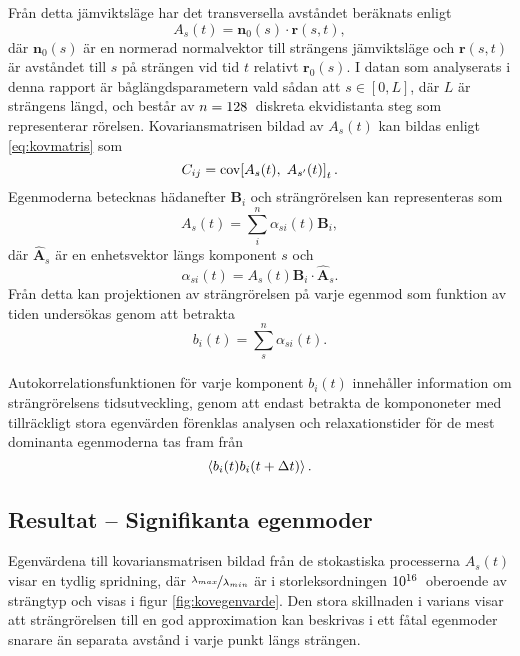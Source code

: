 Från detta jämviktsläge har det transversella avståndet beräknats enligt 
\begin{equation}
A_s(t) = \mathbf{n}_0(s)\cdot\mathbf{r}(s,t),
\end{equation}
där $\mathbf{n}_0(s)$ är en normerad normalvektor till strängens jämviktsläge och $\mathbf{r}(s,t)$ är avståndet till $s$ på strängen vid tid $t$ relativt $\mathbf{r}_0(s)$. I datan som analyserats i denna rapport är båglängdsparametern vald sådan att $s\in[0,L]$, där $L$ är strängens längd, och består av $n=\unit[128]{}$ diskreta ekvidistanta steg som representerar rörelsen. Kovariansmatrisen bildad av $A_s(t)$ kan bildas enligt \eqref{eq:kovmatris} som 
\begin{equation}
    C_{ij} = \text{cov}\!\left[A_s(t),\;A_{s'}(t)\right]_t.
\end{equation}
Egenmoderna betecknas hädanefter $\mathbf{B}_i$ och strängrörelsen kan representeras som
\begin{equation}
    A_s(t) = \sum_i^n \alpha_{si}(t)\mathbf{B}_i,
\end{equation}
där $\hat{\mathbf{A}}_s$ är en enhetsvektor längs komponent $s$ och 
\begin{equation}
    \alpha_{si}(t) = A_s(t)\mathbf{B}_i\cdot\hat{\mathbf{A}}_s.
\end{equation}
Från detta kan projektionen av strängrörelsen på varje egenmod som funktion av tiden undersökas genom att betrakta 
\begin{equation}
    b_i(t) = \sum_s^n \alpha_{si}(t).
\end{equation}

Autokorrelationsfunktionen för varje komponent $b_i(t)$ innehåller information om strängrörelsens tidsutveckling, genom att endast betrakta de kompononeter med tillräckligt stora egenvärden förenklas analysen och relaxationstider för de mest dominanta egenmoderna tas fram från 
\begin{equation}
    \ev{b_i(t)b_i(t+\Delta t)}.
\end{equation}

\subsection{Resultat -- Signifikanta egenmoder}

Egenvärdena till kovariansmatrisen bildad från de stokastiska processerna $A_s(t)$ visar en tydlig spridning, där $\nicefrac{\lambda_{max}}{\lambda_{min}}$ är i storleksordningen $\unit[10^{16}]{}$ oberoende av strängtyp och visas i figur \ref{fig:kovegenvarde}. Den stora skillnaden i varians visar att strängrörelsen till en god approximation kan beskrivas i ett fåtal egenmoder snarare än separata avstånd i varje punkt längs strängen. 


